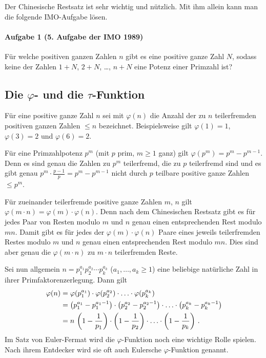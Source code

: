 \documentclass[11pt,a4paper]{article}
\begin{document}
Der Chinesische Restsatz ist sehr wichtig und nützlich. Mit ihm allein kann
man die folgende IMO-Aufgabe lösen.

\paragraph{Aufgabe 1 (5. Aufgabe der IMO 1989)} 
Für welche positiven ganzen Zahlen $n$ gibt es eine positive ganze Zahl $N$,
sodass keine der Zahlen $1+N$, $2+N$, \dots , $n+N$ eine Potenz einer Primzahl
ist?

\subsection*{Die $\varphi$- und die $\tau$-Funktion}

Für eine positive ganze Zahl $n$ sei mit $\varphi(n)$ die Anzahl der zu $n$
teilerfremden positiven ganzen Zahlen $\leq n$ bezeichnet. Beispielsweise gilt
$\varphi(1)=1$, $\varphi(3)=2$ und $\varphi(6)=2$.

Für eine Primzahlpotenz $p^{m}$ (mit $p$ prim, $m\geq 1$ ganz) gilt
$\varphi(p^{m})=p^{m}-p^{m-1}$. Denn es sind genau die Zahlen zu $p^{m}$
teilerfremd, die zu $p$ teilerfremd sind und es gibt genau
$p^{m}\cdot\frac{p-1}{p}=p^{m}-p^{m-1}$ nicht durch $p$ teilbare positive
ganze Zahlen $\leq p^{m}$.

Für zueinander teilerfremde positive ganze Zahlen $m$, $n$ gilt
$\varphi(m\cdot n)=\varphi(m)\cdot\varphi(n)$. Denn nach dem Chinesischen
Restsatz gibt es für jedes Paar von Resten modulo $m$ und $n$ genau einen
entsprechenden Rest modulo $mn$. Damit gibt es für jedes der
$\varphi(m)\cdot\varphi(n)$ Paare eines jeweils teilerfremden Restes modulo
$m$ und $n$ genau einen entsprechenden Rest modulo $mn$. Dies sind aber genau
die $\varphi(m\cdot n)$ zu $m\cdot n$ teilerfremden Reste.

Sei nun allgemein $n=p_{1}^{a_{1}}p_{2}^{a_{2}}\cdots p_{k}^{a_{k}}$
($a_{1},\dots ,a_{k}\geq 1$) eine beliebige natürliche Zahl in ihrer
Primfaktorenzerlegung. Dann gilt 
\begin{align*}
  \varphi(n)&= \varphi(p_{1}^{a_{1}})\cdot \varphi(p_{2}^{a_{2}})
  \cdot\ldots\cdot \varphi(p_{k}^{a_{k}})\\
  &=\left(p_{1}^{a_{1}}-p_{1}^{a_{1}-1}\right)\cdot
  \left(p_{2}^{a_{2}}-p_{2}^{a_{2}-1}\right)\cdot\ldots\cdot
  \left(p_{k}^{a_{k}}-p_{k}^{a_{k}-1}\right)\\
  &=n\,\left(1-\frac{1}{p_{1}}\right)\cdot \left(1-\frac{1}{p_{2}}\right) \cdot\ldots\cdot
  \left(1-\frac{1}{p_{k}}\right)\,. 
\end{align*}
Im Satz von Euler-Fermat wird die $\varphi$-Funktion noch eine wichtige Rolle
spielen. Nach ihrem Entdecker wird sie oft auch Eulersche $\varphi$-Funktion
genannt.
\end{document}

